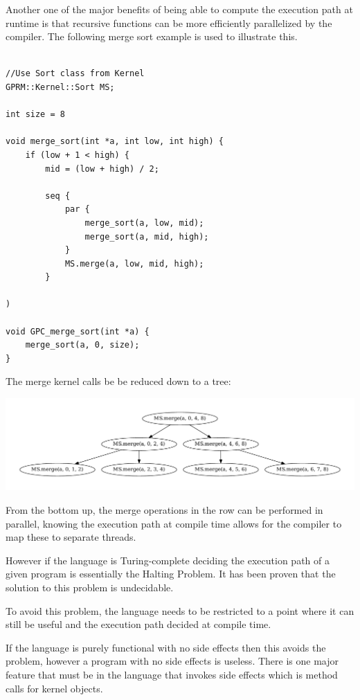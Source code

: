Another one of the major benefits of being able to compute the execution
path at runtime is that recursive functions can be more efficiently parallelized
by the compiler. The following merge sort example is used to illustrate this.

\begin{lstlisting}[style=myGPC]

//Use Sort class from Kernel
GPRM::Kernel::Sort MS;

int size = 8

void merge_sort(int *a, int low, int high) {
    if (low + 1 < high) {
        mid = (low + high) / 2;
   
        seq {
            par {
                merge_sort(a, low, mid);
                merge_sort(a, mid, high);
            }
            MS.merge(a, low, mid, high);            
        }
    
)

void GPC_merge_sort(int *a) {
    merge_sort(a, 0, size);
}

\end{lstlisting}

The merge kernel calls be be reduced down to a tree:

\begin{center}
\includegraphics[scale=0.4]{graphs/mergesortTree.pdf}
\end{center}


From the bottom up, the merge operations in the row can be performed in
parallel, knowing the execution path at compile time allows for the compiler
to map these to separate threads. 


However if the language is Turing-complete deciding the execution path
of a given program is essentially the Halting Problem. It has been proven
that the solution to this problem is undecidable\cite{halting}. 

To avoid this problem, the language needs to be restricted to a point where it can still be useful and the execution
path decided at compile time.

If the language is purely functional with no side effects then this avoids the problem, however a program
with no side effects is useless. There is one major feature that must be in the language that invokes
side effects which is method calls for kernel objects. 


